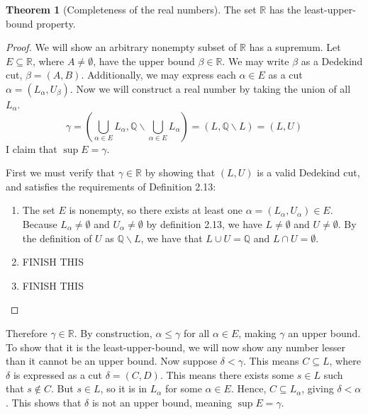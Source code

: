 \documentclass{article}
\newcommand{\R}{\mathbb{R}}
\newcommand{\Q}{\mathbb{Q}}
\theoremstyle{definition}
\newtheorem{theorem}{Theorem}[section]
\begin{document}
\begin{theorem}[Completeness of the real numbers]
	The set $ \R $ has the least-upper-bound property.
	\begin{proof}
	We will show an arbitrary nonempty subset of $ \R $ has a supremum. Let $ E\subseteq \R $, where $ A\neq\emptyset $, have the upper bound $ \beta\in\R $. We may write $ \beta $ as a Dedekind cut, $ \beta=(A,B) $. Additionally, we may express each $ \alpha\in E $ as a cut $ \alpha=(L_\alpha,U_\beta) $. Now we will construct a real number by taking the union of all $ L_\alpha $.
	$$ \gamma=\left(\bigcup_{\alpha\in E}L_\alpha,\Q\backslash \bigcup_{\alpha\in E}L_\alpha\right)=(L,\Q\backslash
	 L)=(L,U)$$  
	I claim that $ \sup E=\gamma $.
	
	First we must verify that $ \gamma\in\R $ by showing that $ (L,U) $ is a valid Dedekind cut, and satisfies the requirements of Definition 2.13: 
	\begin{enumerate}
		\item The set $ E $ is nonempty, so there exists at least one $ \alpha=(L_\alpha,U_\alpha)\in E $. Because $ L_\alpha\neq\emptyset $ and $ U_\alpha\neq\emptyset $ by definition 2.13, we have $ L\neq\emptyset $ and $ U\neq\emptyset $. By the definition of $ U $ as $ \Q\backslash L $, we have that $  L\cup U=\Q$ and $ L\cap U=\emptyset $. 
 		\item {\color{red}FINISH THIS} 
		\item  {\color{red}FINISH THIS} 
	\end{enumerate}
	\end{proof}
Therefore $ \gamma\in\R $. By construction, $ \alpha\le\gamma $ for all $ \alpha\in E $, making $ \gamma $ an upper bound. To show that it is the least-upper-bound, we will now show any number lesser than it cannot be an upper bound. Now suppose $ \delta <\gamma $. This means $  C\subseteq L $, where $ \delta $ is expressed as a cut $ \delta=(C,D) $. This means there exists some $ s\in L $ such that $ s\notin C $. But $ s\in L $, so it is in $ L_\alpha $ for some $ \alpha\in E $. Hence, $ C\subseteq L_\alpha $, giving $ \delta <\alpha $. This shows that $ \delta $ is not an upper bound, meaning $ \sup E =\gamma$.
\end{theorem}
\end{document}

